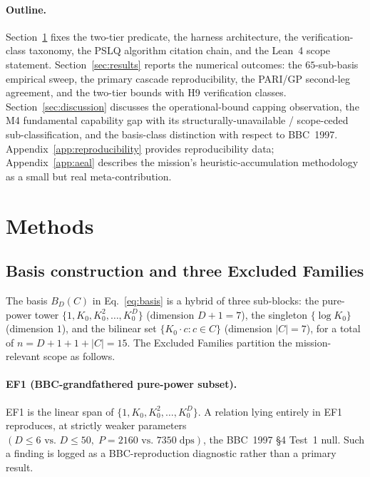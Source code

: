 \documentclass[11pt,a4paper]{article}
\newcommand{\K}{K_{0}}
\newcommand{\BDC}{B_{D}(C)}
\begin{document}
\paragraph{Outline.}
Section~\ref{sec:methods} fixes the two-tier predicate, the harness
architecture, the verification-class taxonomy, the PSLQ algorithm citation
chain, and the Lean~4 scope statement.
Section~\ref{sec:results} reports the numerical outcomes:
the $65$-sub-basis empirical sweep, the primary cascade reproducibility, the
PARI/GP second-leg agreement, and the two-tier bounds with H9 verification
classes.
Section~\ref{sec:discussion} discusses the operational-bound capping
observation, the M4 fundamental capability gap with its
structurally-unavailable / scope-ceded sub-classification, and the
basis-class distinction with respect to BBC~1997.
Appendix~\ref{app:reproducibility} provides reproducibility data;
Appendix~\ref{app:aeal} describes the mission's heuristic-accumulation
methodology as a small but real meta-contribution.

\section{Methods}\label{sec:methods}

\subsection{Basis construction and three Excluded Families}\label{sec:basis-ef}

The basis $\BDC$ in Eq.~\eqref{eq:basis} is a hybrid of three sub-blocks:
the pure-power tower $\{1, \K, \K^{2}, \ldots, \K^{D}\}$ (dimension $D+1=7$),
the singleton $\{\log\K\}$ (dimension $1$), and the bilinear set
$\{\K\cdot c : c \in C\}$ (dimension $|C|=7$), for a total of $n=D+1+1+|C|=15$.
The Excluded Families partition the mission-relevant scope as follows.

\paragraph{EF1 (BBC-grandfathered pure-power subset).}
EF1 is the linear span of $\{1, \K, \K^{2}, \ldots, \K^{D}\}$.
A relation lying entirely in EF1 reproduces, at strictly weaker parameters
$(D{\le}6 \text{ vs.\ } D{\le}50,\;P{=}2160 \text{ vs.\ } 7350\;\text{dps})$,
the BBC~1997 \S 4 Test~1 null.
Such a finding is logged as a BBC-reproduction diagnostic rather than a
primary result.
\end{document}
